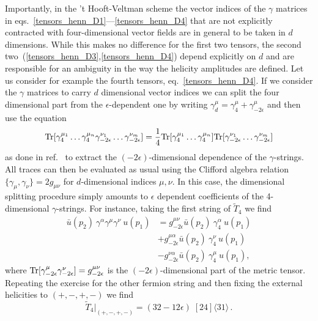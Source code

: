 Importantly, in the 't Hooft-Veltman scheme the vector indices of the $\gamma$ matrices in eqs.~\eqref{tensors_henn_D1}---\eqref{tensors_henn_D4} that are not 
explicitly contracted with four-dimensional vector fields 
are in general to be taken in 
$d$ dimensions. While this makes no difference for the 
first two tensors, the second two~(\ref{tensors_henn_D3},\ref{tensors_henn_D4})  
depend explicitly on $d$ and are responsible for an ambiguity 
in the way the helicity amplitudes are defined.
Let us consider for example the fourth tensors, eq.~\eqref{tensors_henn_D4}. 
If we consider the $\gamma$ matrices to carry $d$ dimensional vector indices we can
split the four dimensional part from the
$\epsilon$-dependent one by writing 
$\gamma^\mu_d = \gamma^\mu_4 + \gamma^{\mu}_{-2 \epsilon}$ and then use the equation 
\begin{equation}
    {\rm Tr}[\gamma_4^{\mu_1} \dots \gamma_4^{\mu_n} \gamma_{-2\epsilon}^{\nu_1} \dots \gamma_{-2\epsilon}^{\nu_m} ] = \frac{1}{4}     {\rm Tr}[\gamma_4^{\mu_1} \dots \gamma_4^{\mu_n} ]     {\rm Tr}[ \gamma_{-2\epsilon}^{\nu_1} \dots \gamma_{-2\epsilon}^{\nu_m} ] 
\end{equation}
as done in ref.~\cite{Cullen:2010jv} to extract the $(-2\epsilon)$-dimensional dependence of the $\gamma$-strings. All traces can then be evaluated as usual using the Clifford algebra relation $\{\gamma_\mu,\gamma_\nu\} = 2 g_{\mu \nu}$ for $d$-dimensional indices $\mu,\nu$. In this case, the dimensional splitting procedure simply amounts to $\epsilon$ dependent coefficients of the 4-dimensional $\gamma$-strings. For instance, taking the first string of $\widetilde{T}_4$ we find  
\begin{align}
    {\bar u} (p_2)\: \gamma^\alpha \gamma^\mu  \gamma^\nu \: { u} (p_1)& = g_{-2\epsilon}^{\mu \nu}  {\bar u} (p_2)\: \gamma_4^\alpha \: { u} (p_1) \nonumber \\
    &+ g_{-2\epsilon}^{\mu \alpha}  {\bar u} (p_2)\: \gamma_4^\nu \: { u} (p_1) \nonumber \\ 
    &-  g_{-2\epsilon}^{\nu \alpha}  {\bar u} (p_2)\: \gamma_4^\mu \: { u} (p_1),
\end{align}
where ${\rm Tr}[\gamma_{-2\epsilon}^\mu \gamma_{-2\epsilon}^\nu] = g_{-2\epsilon}^{\mu \nu} $ is the $(-2\epsilon)$-dimensional part of the metric tensor. Repeating the exercise for the other fermion string and then fixing the external helicities to $(+,-,+,-)$ 
we find
\begin{equation}
\widetilde T_4|_{(+,-,+,-)} = (32 - 12 \epsilon) \; [24]\langle 3 1 \rangle\,.
\end{equation}
